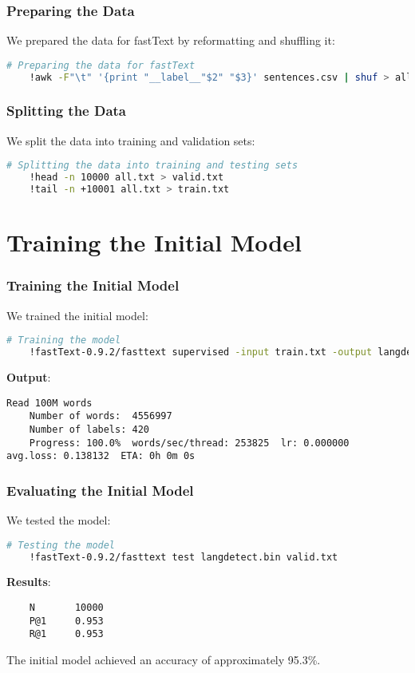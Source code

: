 \documentclass{beamer}
\begin{document}
\begin{frame}[fragile]
    \frametitle{Preparing the Data}
    We prepared the data for fastText by reformatting and shuffling it:
    \begin{lstlisting}[language=bash]
    # Preparing the data for fastText
    !awk -F"\t" '{print "__label__"$2" "$3}' sentences.csv | shuf > all.txt
    \end{lstlisting}
\end{frame}

\begin{frame}[fragile]
    \frametitle{Splitting the Data}
    We split the data into training and validation sets:
    \begin{lstlisting}[language=bash]
    # Splitting the data into training and testing sets
    !head -n 10000 all.txt > valid.txt
    !tail -n +10001 all.txt > train.txt
    \end{lstlisting}
\end{frame}

\section{Training the Initial Model}

\begin{frame}[fragile]
    \frametitle{Training the Initial Model}
    We trained the initial model:
    \begin{lstlisting}[language=bash]
    # Training the model
    !fastText-0.9.2/fasttext supervised -input train.txt -output langdetect -dim 16
    \end{lstlisting}
    \textbf{Output}:
    \begin{lstlisting}[basicstyle=\ttfamily\scriptsize]
    Read 100M words
    Number of words:  4556997
    Number of labels: 420
    Progress: 100.0%  words/sec/thread: 253825  lr: 0.000000  avg.loss: 0.138132  ETA: 0h 0m 0s
    \end{lstlisting}
\end{frame}

\begin{frame}[fragile]
    \frametitle{Evaluating the Initial Model}
    We tested the model:
    \begin{lstlisting}[language=bash]
    # Testing the model
    !fastText-0.9.2/fasttext test langdetect.bin valid.txt
    \end{lstlisting}
    \textbf{Results}:
    \begin{lstlisting}
    N       10000
    P@1     0.953
    R@1     0.953
    \end{lstlisting}
    The initial model achieved an accuracy of approximately 95.3\%.
\end{frame}
\end{document}
